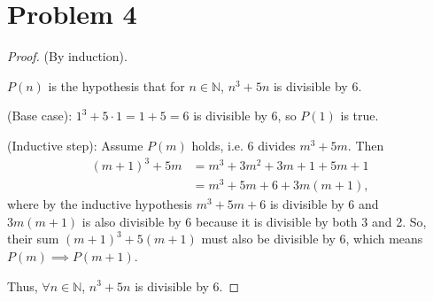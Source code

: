 \documentclass{article}
\begin{document}
\section*{Problem 4}
\begin{proof}
	(By induction). 
	
	$P(n)$ is the hypothesis that for $n\in\mathbb{N}$, $n^3 + 5n$ is divisible by $6$.
	
	(Base case): $1^3 + 5\cdot1 = 1 + 5 = 6$ is divisible by 6, so $P(1)$ is true. 
	
	(Inductive step): Assume $P(m)$ holds, i.e. 6 divides $m^3 + 5m$. Then
	\begin{align}
		(m+1)^3 + 5m &= m^3 + 3m^2 + 3m + 1 + 5m + 1 \\
		&= m^3 + 5m + 6 + 3m(m+1), 
	\end{align}
	where by the inductive hypothesis $m^3 +5m + 6$ is divisible by 6 and $3m(m+1)$ is also divisible by 6 because it is divisible by both 3 and 2. So, their sum $(m+1)^3 + 5(m+1)$ must also be divisible by 6, which means $P(m)\implies P(m+1)$.
	
	Thus, $\forall n\in\mathbb{N}$, $n^3 + 5n$ is divisible by 6. 
\end{proof}
\end{document}

